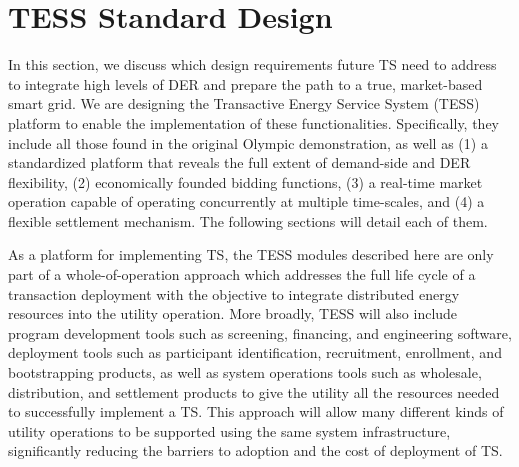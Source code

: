 \section{TESS Standard Design}\label{sec:standard_design}

In this section, we discuss which design requirements future TS need to address to integrate high levels of DER and prepare the path to a true, market-based smart grid.
We are designing the Transactive Energy Service System (TESS) platform to enable the implementation of these functionalities.
Specifically, they include all those found in the original Olympic demonstration, as well as (1) a standardized platform that reveals the full extent of demand-side and DER flexibility, (2) economically founded bidding functions, (3) a real-time market operation capable of operating concurrently at multiple time-scales, and (4) a flexible settlement mechanism. 
The following sections will detail each of them.

As a platform for implementing TS, the TESS modules described here are only part of a whole-of-operation approach which addresses the full life cycle of a transaction deployment with the objective to integrate distributed energy resources into the utility operation.  
More broadly, TESS will also include program development tools such as screening, financing, and engineering software, deployment tools such as participant identification, recruitment, enrollment, and bootstrapping products, as well as system operations tools such as wholesale, distribution, and settlement products to give the utility all the resources needed to successfully implement a TS.
This approach will allow many different kinds of utility operations to be supported using the same system infrastructure, significantly reducing the barriers to adoption and the cost of deployment of TS. 

